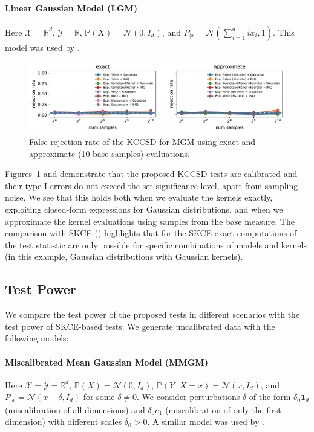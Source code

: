 \documentclass{uai2023} %
\begin{document}
\paragraph{Linear Gaussian Model (LGM)}
Here $\mathcal{X} = \mathbb{R}^d$, $\mathcal{Y} = \mathbb{R}$, $\mathbb{P}(X) = \mathcal{N}(0, I_d)$, and $P_{|x} = \mathcal{N}(\sum_{i=1}^d ix_i, 1)$. This model was used by \citet{jitkrittum2020testing}.

\begin{figure}
    \centering
    \includegraphics[width=\linewidth]{paper/figures/mgm_kccsd.pdf}
    \caption{False rejection rate of the KCCSD for MGM using exact and approximate (10 base samples) evaluations.}
    \label{fig:mgm_kccsd}
\end{figure}

Figures~\ref{fig:mgm_kccsd} and  demonstrate that the proposed KCCSD tests are calibrated and their type I errors do not exceed the set significance level, apart from sampling noise.
We see that this holds both when we evaluate the kernels exactly, exploiting closed-form expressions for Gaussian distributions, and when we approximate the kernel evaluations using samples from the base measure.
The comparison with SKCE () highlights that for the SKCE exact computations of the test statistic are only possible for specific combinations of models and kernels (in this example, Gaussian distributions with Gaussian kernels).

\subsection{Test Power}

We compare the test power of the proposed tests in different scenarios with the test power of SKCE-based tests.
We generate uncalibrated data with the following models:

\paragraph{Miscalibrated Mean Gaussian Model (MMGM)}
Here $\mathcal{X} = \mathcal{Y} = \mathbb{R}^d$, $\mathbb{P}(X) = \mathcal{N}(0, I_d)$, $\mathbb{P}(Y \,|\, X = x) = \mathcal{N}(x, I_d)$, and $P_{|x} = \mathcal{N}(x + \delta, I_d)$ for some $\delta \neq 0$.
We consider perturbations $\delta$ of the form $\delta_0 \bm{1}_d$ (miscalibration of all dimensions) and $\delta_0 e_1$ (miscalibration of only the first dimension) with different scales $\delta_0 > 0$.
A similar model was used by \citet{widmann2022calibration}.
\end{document}
